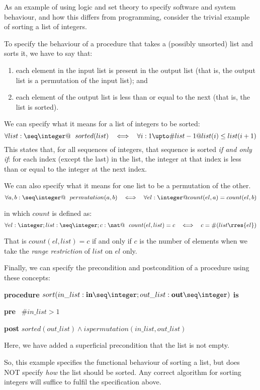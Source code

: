 \begin{example}
As an example of using logic and set theory to specify software and system behaviour, and how this differs from programming, consider the trivial example of sorting a list of integers.

To specify the behaviour of a procedure that takes a (possibly unsorted) list and sorts it, we have to say that:

\begin{enumerate}

 \item each element in the input list is present in the output list (that is, the output list is a permutation of the input list); and

 \item each element of the output list is less than or equal to the next (that is, the list is sorted).

\end{enumerate}


We can specify what it means for a list of integers to be sorted:
\[
 \forall list : \seq \integer @ ~~sorted(list)~~ \iff~~  \forall i : 1 \upto \#list - 1 @ list(i) \leq list(i + 1)
\]
This states that, for all sequences of integers, that sequence is sorted \emph{if and only if}: for each index (except the last) in the list, the integer at that index is less than or equal to the integer at the next index.

We can also specify what it means for one list to be a permutation of the other.
\[
 \forall a, b : \seq \integer @  ~~permutation(a,b)~~ \iff~~  \forall el : \integer @ count(el, a)  = count(el, b)
\]
 
in which $\mathit{count}$ is defined as:
\[
 \forall el : \integer; list : \seq \integer; c : \nat @~~ count(el, list) = c ~~\iff~~
    c = \#(list\rres \{el\})
\]

That is $count(el, list) = c$ if and only if $c$ is the number of elements when we take the \emph{range restriction} of $list$ on $el$ only.

Finally, we can specify the precondition and postcondition of a procedure using these concepts:

\textbf{procedure}  $sort (in\_list : \textbf{in} \seq \integer; out\_list : \textbf{out} \seq\integer)$ \textbf{is}

\vspace{-2mm}

\quad \textbf{pre} ~$\#in\_list > 1$

\vspace{-2mm}

\quad \textbf{post} $sorted(out\_list) \land is permutation(in\_list, out\_list)$

Here, we have added a superficial precondition that the list is not empty.

So, this example specifies the functional behaviour of sorting a list, but does NOT specify \emph{how} the list should be sorted. Any correct algorithm for sorting integers will suffice to fulfil the specification above.

\end{example}

